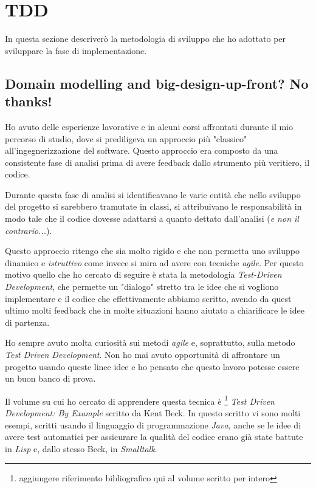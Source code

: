 \section{TDD}

In questa sezione descriver\`o la metodologia di sviluppo che ho
adottato per sviluppare la fase di implementazione.

\subsection{Domain modelling and big-design-up-front? No thanks!}
Ho avuto delle esperienze lavorative e in alcuni corsi affrontati
durante il mio percorso di studio, dove si prediligeva un approccio
pi\`u "classico" all'ingegnerizzazione del software. Questo approccio
era composto da una consistente fase di analisi prima di avere
feedback dallo strumento pi\`u veritiero, il codice. 

Durante questa fase di analisi si identificavano le varie entit\`a che
nello sviluppo del progetto si sarebbero tramutate in classi, si
attribuivano le responsabilit\`a in modo tale che il codice dovesse
adattarsi a quanto dettato dall'analisi (\emph{e non il
  contrario...}).

Questo approccio ritengo che sia molto rigido e che non permetta uno
sviluppo dinamico e \emph{istruttivo} come invece si mira ad avere con
tecniche \emph{agile}. Per questo motivo quello che ho cercato di
seguire \`e stata la metodologia \emph{Test-Driven Development}, che
permette un "dialogo" stretto tra le idee che si vogliono implementare
e il codice che effettivamente abbiamo scritto, avendo da quest ultimo
molti feedback che in molte situazioni hanno aiutato a chiarificare le
idee di partenza.

Ho sempre avuto molta curiosit\`a sui metodi \emph{agile} e,
soprattutto, sulla metodo \emph{Test Driven Development}. Non ho mai
avuto opportunit\`a di affrontare un progetto usando queste linee idee
e ho pensato che questo lavoro potesse essere un buon banco di prova.

Il volume su cui ho cercato di apprendere questa tecnica \`e
\footnote{aggiungere riferimento bibliografico qui al volume scritto
  per intero} \emph{Test Driven Development: By Example} scritto da
Kent Beck. In questo scritto vi sono molti esempi, scritti usando il
linguaggio di programmazione \emph{Java}, anche se le idee di avere
test automatici per assicurare la qualit\`a del codice erano gi\`a
state battute in \emph{Lisp} e, dallo stesso Beck, in
\emph{Smalltalk}.

